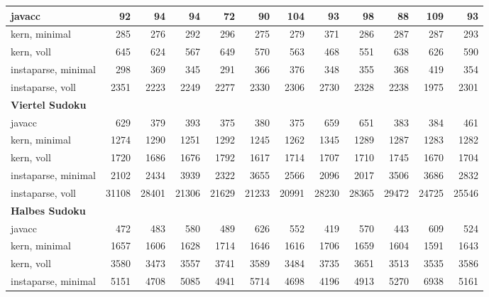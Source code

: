 \documentclass[ngerman,a4paper,abstracton,open=right,twoside=false,toc=listofnumbered,bibtotocnumbered]{scrreprt}
\begin{document}
\begin{table}[!h]
{{\begin{tabular}{|l|r|r|r|r|r|r|r|r|r|r|r|}
				javacc  & 92 & 94 & 94 & 72 & 90 & 104 & 93 & 98 & 88 & 109 & 93 \\ \hline
				kern, minimal   & 285 & 276 & 292 & 296 & 275 & 279 & 371 & 286 & 287 & 287 & 293 \\ \hline
				kern, voll   & 645 & 624 & 567 & 649 & 570 & 563 & 468 & 551 & 638 & 626 & 590 \\ \hline
				instaparse, minimal   & 298 & 369 & 345 & 291 & 366 & 376 & 348 & 355 & 368 & 419 & 354 \\ \hline
				instaparse, voll   & 2351 & 2223 & 2249 & 2277 & 2330 & 2306 & 2730 & 2328 & 2238 & 1975 & 2301 \\ \hline
				\textbf{Viertel Sudoku} & \multicolumn{1}{l|}{} & \multicolumn{1}{l|}{} & \multicolumn{1}{l|}{} & \multicolumn{1}{l|}{} & \multicolumn{1}{l|}{} & \multicolumn{1}{l|}{} & \multicolumn{1}{l|}{} & \multicolumn{1}{l|}{} & \multicolumn{1}{l|}{} & \multicolumn{1}{l|}{} & \multicolumn{1}{l|}{} \\ \hline
				javacc  & 629 & 379 & 393 & 375 & 380 & 375 & 659 & 651 & 383 & 384 & 461 \\ \hline
				kern, minimal   & 1274 & 1290 & 1251 & 1292 & 1245 & 1262 & 1345 & 1289 & 1287 & 1283 & 1282 \\ \hline
				kern, voll   & 1720 & 1686 & 1676 & 1792 & 1617 & 1714 & 1707 & 1710 & 1745 & 1670 & 1704 \\ \hline
				instaparse, minimal   & 2102 & 2434 & 3939 & 2322 & 3655 & 2566 & 2096 & 2017 & 3506 & 3686 & 2832 \\ \hline
				instaparse, voll   & 31108 & 28401 & 21306 & 21629 & 21233 & 20991 & 28230 & 28365 & 29472 & 24725 & 25546 \\ \hline
				\textbf{Halbes Sudoku} & \multicolumn{1}{l|}{} & \multicolumn{1}{l|}{} & \multicolumn{1}{l|}{} & \multicolumn{1}{l|}{} & \multicolumn{1}{l|}{} & \multicolumn{1}{l|}{} & \multicolumn{1}{l|}{} & \multicolumn{1}{l|}{} & \multicolumn{1}{l|}{} & \multicolumn{1}{l|}{} & \multicolumn{1}{l|}{} \\ \hline
				javacc  & 472 & 483 & 580 & 489 & 626 & 552 & 419 & 570 & 443 & 609 & 524 \\ \hline
				kern, minimal   & 1657 & 1606 & 1628 & 1714 & 1646 & 1616 & 1706 & 1659 & 1604 & 1591 & 1643 \\ \hline
				kern, voll   & 3580 & 3473 & 3557 & 3741 & 3589 & 3484 & 3735 & 3651 & 3513 & 3535 & 3586 \\ \hline
				instaparse, minimal   & 5151 & 4708 & 5085 & 4941 & 5714 & 4698 & 4196 & 4913 & 5270 & 6938 & 5161 \\ \hline

\end{tabular}}}
\end{table}
\end{document}
